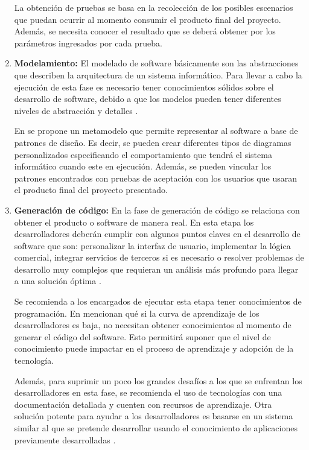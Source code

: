 \begin{enumerate}
	La obtención de pruebas se basa en la recolección de los posibles escenarios que puedan ocurrir al momento consumir el producto final del proyecto. Además, se necesita conocer el resultado que se deberá obtener por los parámetros ingresados por cada prueba. 
	
	\item \textbf{Modelamiento: } El modelado de software básicamente son las abstracciones que describen la arquitectura de un sistema informático. Para llevar a cabo la ejecución de esta fase es necesario tener conocimientos sólidos sobre el desarrollo de software, debido a que los modelos pueden tener diferentes niveles de abstracción y detalles \cite{Kudo}. 
	
	En \cite{Kudo} se propone un metamodelo que permite representar al software a base de patrones de diseño. Es decir, se pueden crear diferentes tipos de diagramas personalizados especificando el comportamiento que tendrá el sistema informático cuando este en ejecución. Además, se pueden vincular los patrones encontrados con pruebas de aceptación con los usuarios que usaran el producto final del proyecto presentado. 
	
	\item \textbf{Generación de código:} En la fase de generación de código se relaciona con obtener el producto o software de manera real. En esta etapa los desarrolladores deberán cumplir con algunos puntos claves en el desarrollo de software que son: personalizar la interfaz de usuario, implementar la lógica comercial, integrar servicios de terceros si es necesario o resolver problemas de desarrollo muy complejos que requieran un análisis más profundo para llegar a una solución óptima \cite{Rokis2022}.
	
	Se recomienda a los encargados de ejecutar esta etapa tener conocimientos de programación. En \cite{Rokis2022} mencionan qué si la curva de aprendizaje de los desarrolladores es baja, no necesitan obtener conocimientos al momento de generar el código del software. Esto permitirá suponer que el nivel de conocimiento puede impactar en el proceso de aprendizaje y adopción de la tecnología. 
	
	Además, para suprimir un poco los grandes desafíos a los que se enfrentan los desarrolladores en esta fase, se recomienda el uso de tecnologías con una documentación detallada y cuenten con recursos de aprendizaje. Otra solución potente para ayudar a los desarrolladores es basarse en un sistema similar al que se pretende desarrollar usando el conocimiento de aplicaciones previamente desarrolladas \cite{Rokis2022}.  
	

\end{enumerate}
